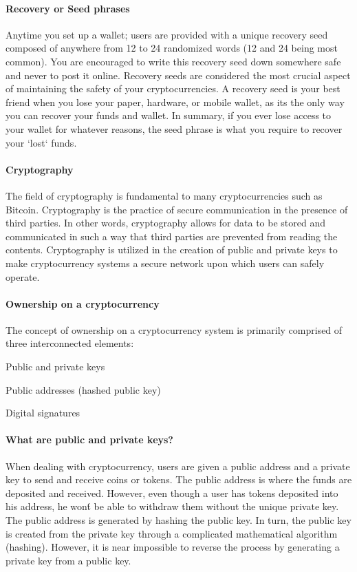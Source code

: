 \paragraph{Recovery or Seed phrases}
Anytime you set up a wallet; users are provided with a unique recovery seed composed of anywhere from 12 to 24 randomized words (12 and 24 being most common). You are encouraged to write this recovery seed down somewhere safe and never to post it online. Recovery seeds are considered the most crucial aspect of maintaining the safety of your cryptocurrencies. A recovery seed is your best friend when you lose your paper, hardware, or mobile wallet, as its the only way you can recover your funds and wallet. In summary, if you ever lose access to your wallet for whatever reasons, the seed phrase is what you require to recover your `lost` funds. 

\paragraph{Cryptography}
The field of cryptography is fundamental to many cryptocurrencies such as Bitcoin. Cryptography is the practice of secure communication in the presence of third parties. In other words, cryptography allows for data to be stored and communicated in such a way that third parties are prevented from reading the contents. Cryptography is utilized in the creation of public and private keys to make cryptocurrency systems a secure network upon which users can safely operate.

\paragraph{Ownership on a cryptocurrency}

The concept of ownership on a cryptocurrency system is primarily comprised of three interconnected elements:
\begin{list}
\item{Public and private keys}
\item{Public addresses (hashed public key)}
\item{Digital signatures}
\end{list}


\paragraph{What are public and private keys?}
When dealing with cryptocurrency, users are given a public address and a private key to send and receive coins or tokens. The public address is where the funds are deposited and received. However, even though a user has tokens deposited into his address, he won\'t be able to withdraw them without the unique private key. The public address is generated by hashing the public key. In turn, the public key is created from the private key through a complicated mathematical algorithm (hashing). However, it is near impossible to reverse the process by generating a private key from a public key. 


